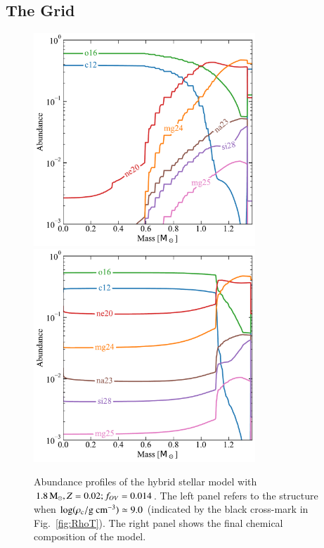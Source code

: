 \documentclass[main.tex]{subfiles}
\begin{document}
\begin{subappendices}
\section{The \seriesone Grid}\label{apx:composition_seriesI}


\begin{figure}[hbt!]
    \centering
    \includegraphics[height=8cm]{figures/chapter2/abundances/1p8_logRho9_abun.pdf}\quad
    \includegraphics[height=8cm]{figures/chapter2/abundances/1p8_final_abun.pdf}
    \caption{Abundance profiles of the \seriesone hybrid stellar model with $ 1.8\mathrm{\,M_\odot},  Z=0.02;f_{OV}=0.014$. The left panel refers to the structure when $\rm \log(\rho_c / g \ cm^{-3}) \simeq 9.0$ (indicated by the black cross-mark in Fig.~\ref{fig:RhoT}). The right panel shows the final chemical composition of the model.} 
\end{figure}


\end{subappendices}
\end{document}
